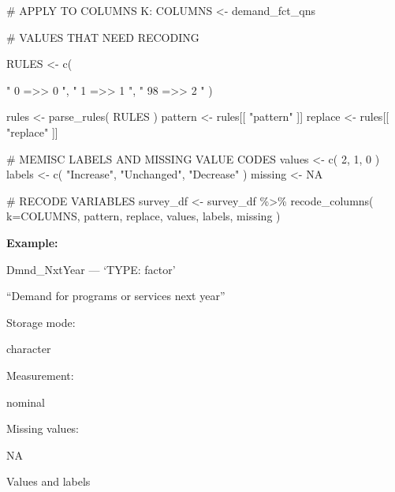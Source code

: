 \documentclass[
  letterpaper,
]{scrbook}
\newenvironment{Shaded}{\begin{snugshade}}{\end{snugshade}}
\newcommand{\AttributeTok}[1]{\textcolor[rgb]{0.40,0.45,0.13}{#1}}
\newcommand{\CommentTok}[1]{\textcolor[rgb]{0.37,0.37,0.37}{#1}}
\newcommand{\ConstantTok}[1]{\textcolor[rgb]{0.56,0.35,0.01}{#1}}
\newcommand{\DecValTok}[1]{\textcolor[rgb]{0.68,0.00,0.00}{#1}}
\newcommand{\FunctionTok}[1]{\textcolor[rgb]{0.28,0.35,0.67}{#1}}
\newcommand{\NormalTok}[1]{\textcolor[rgb]{0.00,0.23,0.31}{#1}}
\newcommand{\OtherTok}[1]{\textcolor[rgb]{0.00,0.23,0.31}{#1}}
\newcommand{\SpecialCharTok}[1]{\textcolor[rgb]{0.37,0.37,0.37}{#1}}
\newcommand{\StringTok}[1]{\textcolor[rgb]{0.13,0.47,0.30}{#1}}
\begin{document}
\begin{Shaded}
\begin{Highlighting}[]
\CommentTok{\# APPLY TO COLUMNS K:}
\NormalTok{COLUMNS }\OtherTok{\textless{}{-}}\NormalTok{  demand\_fct\_qns}

\CommentTok{\# VALUES THAT NEED RECODING}

\NormalTok{RULES }\OtherTok{\textless{}{-}} \FunctionTok{c}\NormalTok{(    }
          
             \StringTok{"   0    =\textgreater{}\textgreater{}     0   "}\NormalTok{,}
             \StringTok{"   1    =\textgreater{}\textgreater{}     1   "}\NormalTok{, }
             \StringTok{"  98    =\textgreater{}\textgreater{}     2   "}\NormalTok{     )}


\NormalTok{rules }\OtherTok{\textless{}{-}} \FunctionTok{parse\_rules}\NormalTok{( RULES )          }
\NormalTok{pattern }\OtherTok{\textless{}{-}}\NormalTok{ rules[[ }\StringTok{"pattern"}\NormalTok{ ]]}
\NormalTok{replace }\OtherTok{\textless{}{-}}\NormalTok{ rules[[ }\StringTok{"replace"}\NormalTok{ ]]}

\CommentTok{\# MEMISC LABELS AND MISSING VALUE CODES }
\NormalTok{values  }\OtherTok{\textless{}{-}} \FunctionTok{c}\NormalTok{( }\DecValTok{2}\NormalTok{, }\DecValTok{1}\NormalTok{, }\DecValTok{0}\NormalTok{ )}
\NormalTok{labels  }\OtherTok{\textless{}{-}} \FunctionTok{c}\NormalTok{( }\StringTok{"Increase"}\NormalTok{, }\StringTok{"Unchanged"}\NormalTok{, }\StringTok{"Decrease"}\NormalTok{ )}
\NormalTok{missing }\OtherTok{\textless{}{-}} \ConstantTok{NA}

\CommentTok{\# RECODE VARIABLES }
\NormalTok{survey\_df }\OtherTok{\textless{}{-}} 
\NormalTok{  survey\_df }\SpecialCharTok{\%\textgreater{}\%} 
  \FunctionTok{recode\_columns}\NormalTok{( }\AttributeTok{k=}\NormalTok{COLUMNS, pattern, replace, values, labels, missing )}
\end{Highlighting}
\end{Shaded}

\textbf{Example:}

Dmnd\_NxtYear --- {`TYPE: factor'}

``Demand for programs or services next year''

Storage mode:

character

Measurement:

nominal

Missing values:

NA

Values and labels
\end{document}
